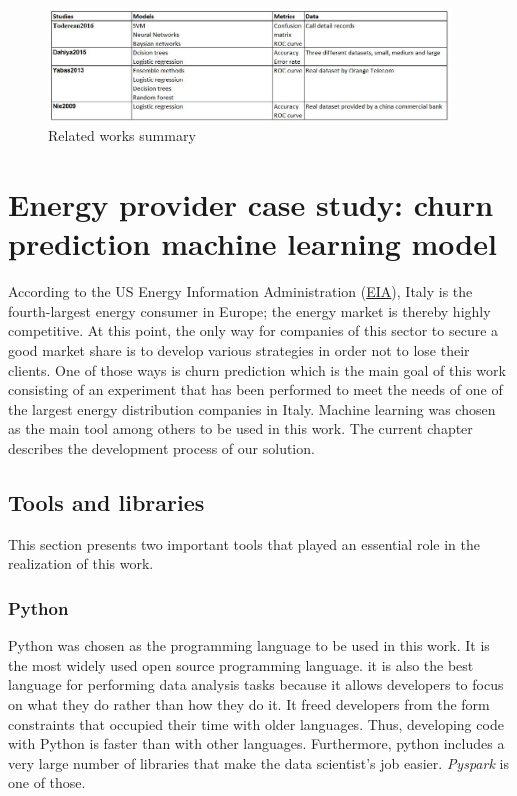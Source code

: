\documentclass[LaM,binding=0.6cm, english]{sapthesis}
\begin{document}
\begin{figure}[!ht]
    \includegraphics[width=0.95\textwidth]{images/studies_summary.jpg}
    \centering
    \caption{Related works summary}
    \label{fig:studies-summary}
\end{figure}

\chapter{Energy provider case study: churn prediction machine learning model}

According to the US Energy Information Administration (\href{https://www.eia.gov/}{EIA}), Italy is the fourth-largest energy consumer in Europe; the energy market is thereby highly competitive. At this point, the only way for companies of this sector to secure a good market share is to develop various strategies in order not to lose their clients. One of those ways is churn prediction which is the main goal of this work consisting of an experiment that has been performed to meet the needs of one of the largest energy distribution companies in Italy. Machine learning was chosen as the main tool among others to be used in this work. The current chapter describes the development process of our solution.
 
\section{Tools and libraries}

This section presents two important tools that played an essential role in the realization of this work.

\subsection{Python}

Python was chosen as the programming language to be used in this work. It is the most widely used open source programming language. it is also the best language for performing data analysis tasks because it allows developers to focus on what they do rather than how they do it. It freed developers from the form constraints that occupied their time with older languages. Thus, developing code with Python is faster than with other languages. Furthermore, python includes a very large number of libraries that make the data scientist's job easier. \textit{Pyspark} is one of those.
\end{document}
